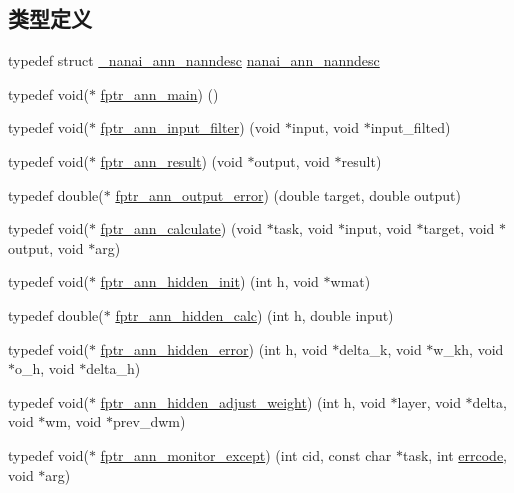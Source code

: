 \subsection*{类型定义}
\begin{DoxyCompactItemize}
\item 
typedef struct \hyperlink{structnanai_1_1__nanai__ann__nanndesc}{\+\_\+nanai\+\_\+ann\+\_\+nanndesc} \hyperlink{namespacenanai_a892a8c80381d0005a076b68fbbf2d918}{nanai\+\_\+ann\+\_\+nanndesc}
\item 
typedef void($\ast$ \hyperlink{namespacenanai_a3be739c74db7d7304ff72dbcefbdc046}{fptr\+\_\+ann\+\_\+main}) ()
\item 
typedef void($\ast$ \hyperlink{namespacenanai_a681d28f80aa95597ffc268b3b01abcfc}{fptr\+\_\+ann\+\_\+input\+\_\+filter}) (void $\ast$input, void $\ast$input\+\_\+filted)
\item 
typedef void($\ast$ \hyperlink{namespacenanai_ab737ac3c4f32f96a8ee6400db1c5a90f}{fptr\+\_\+ann\+\_\+result}) (void $\ast$output, void $\ast$result)
\item 
typedef double($\ast$ \hyperlink{namespacenanai_a5e697a4846a90e7e161e1d2d5be57688}{fptr\+\_\+ann\+\_\+output\+\_\+error}) (double target, double output)
\item 
typedef void($\ast$ \hyperlink{namespacenanai_ac1a3ebd721fc3cfe1b9accfe7b65b7fe}{fptr\+\_\+ann\+\_\+calculate}) (void $\ast$task, void $\ast$input, void $\ast$target, void $\ast$output, void $\ast$arg)
\item 
typedef void($\ast$ \hyperlink{namespacenanai_a5fc4ff646e59919360af1ef410fe9671}{fptr\+\_\+ann\+\_\+hidden\+\_\+init}) (int h, void $\ast$wmat)
\item 
typedef double($\ast$ \hyperlink{namespacenanai_a299d9093f72831a48d205e94e200690c}{fptr\+\_\+ann\+\_\+hidden\+\_\+calc}) (int h, double input)
\item 
typedef void($\ast$ \hyperlink{namespacenanai_aa8cd8d38cbd0a27e2818f132a3cfa2a2}{fptr\+\_\+ann\+\_\+hidden\+\_\+error}) (int h, void $\ast$delta\+\_\+k, void $\ast$w\+\_\+kh, void $\ast$o\+\_\+h, void $\ast$delta\+\_\+h)
\item 
typedef void($\ast$ \hyperlink{namespacenanai_a1d9a4524c199b1a2891e208ce4b05306}{fptr\+\_\+ann\+\_\+hidden\+\_\+adjust\+\_\+weight}) (int h, void $\ast$layer, void $\ast$delta, void $\ast$wm, void $\ast$prev\+\_\+dwm)
\item 
typedef void($\ast$ \hyperlink{namespacenanai_ad9527fac6e647a6c149e4f9a8681e4c1}{fptr\+\_\+ann\+\_\+monitor\+\_\+except}) (int cid, const char $\ast$task, int \hyperlink{namespacenanai_a43ed38739d33505ddadbaf7a0aad04d7}{errcode}, void $\ast$arg)

\end{DoxyCompactItemize}
